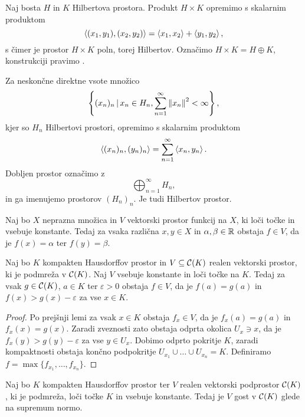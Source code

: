 Naj bosta $H$ in $K$ Hilbertova prostora.
Produkt $H \times K$ opremimo s skalarnim produktom
\[
  \left< (x_1,y_1), (x_2, y_2) \right> = \left< x_1, x_2 \right> + \left< y_1, y_2 \right>,
\]
s čimer je prostor $H \times K$ poln, torej Hilbertov.
Označimo $H \times K = H \oplus K$, konstrukciji pravimo .

Za neskončne direktne vsote množico
\[
  \left\{ (x_n)_n \,|\, x_n \in H_n, \sum_{n=1}^\infty \left\lVert x_n\right\rVert^2 < \infty
  \right\},
\]
kjer so $H_n$ Hilbertovi prostori, opremimo s skalarnim produktom
\[
  \left< (x_n)_n, (y_n)_n \right> = \sum_{n=1}^\infty \left< x_n, y_n \right>.
\]
Dobljen prostor označimo z
\[
  \bigoplus_{n=1}^\infty H_n,
\]
in ga imenujemo  prostorov $(H_n)_n$.
Je tudi Hilbertov prostor.


\begin{lema}
  Naj bo $X$ neprazna množica in $V$ vektorski prostor funkcij na $X$, ki loči
  točke in vsebuje konstante.
  Tedaj za vsaka različna $x, y \in X$ in $\alpha, \beta \in \mathbb{R}$ obstaja $f \in
  V$, da je $f(x) = \alpha$ ter $f(y) = \beta$.
\end{lema}

\begin{lema}
  Naj bo $K$ kompakten Hausdorffov prostor in $V \subseteq \mathcal{C}(K)$ realen
  vektorski prostor, ki je podmreža v $\mathcal{C}(K)$.
  Naj $V$ vsebuje konstante in loči točke na $K$.
  Tedaj za vsak $g \in \mathcal{C}(K)$, $a \in K$ ter $\varepsilon > 0$ obstaja $f
  \in V$, da je $f(a) = g(a)$ in $f(x) > g(x) - \varepsilon$ za vse $x \in K$.
\end{lema}

\begin{proof}
  Po prejšnji lemi za vsak $x \in K$ obstaja $f_x \in V$, da je $f_x(a) = g(a)$
  in $f_x(x) = g(x)$.
  Zaradi zveznosti zato obstaja odprta okolica $U_x \ni x$, da je $f_x(y) > g(y)
  - \varepsilon$ za vse $y \in U_x$.
  Dobimo odprto pokritje $K$, zaradi kompaktnosti obstaja končno podpokritje
  $U_{x_1} \cup \ldots \cup U_{x_n} = K$.
  Definiramo $f = \max\{f_{x_1}, \ldots, f_{x_n}\}$.
\end{proof}

\begin{izrek}
  Naj bo $K$ kompakten Hausdorffov prostor ter $V$ realen vektorski podprostor
  $\mathcal{C}(K)$, ki je podmreža, loči točke $K$ in vsebuje konstante.
  Tedaj je $V$ gost v $\mathcal{C}(K)$ glede na supremum normo.
\end{izrek}

